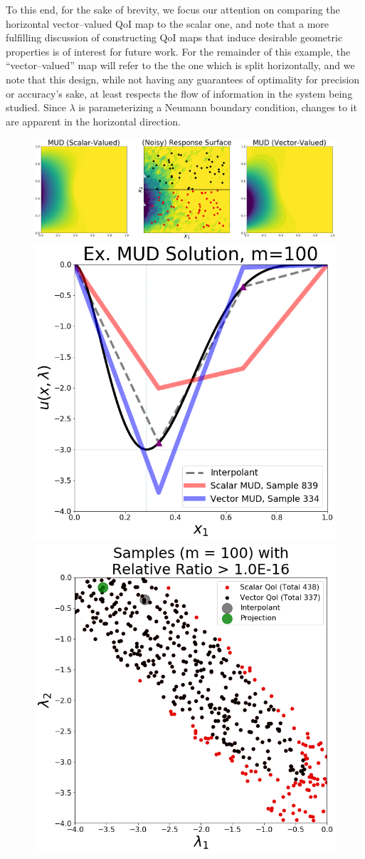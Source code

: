To this end, for the sake of brevity, we focus our attention on comparing the horizontal vector--valued QoI map to the scalar one, and note that a more fulfilling discussion of constructing QoI maps that induce desirable geometric properties is of interest for future work.
For the remainder of this example, the ``vector--valued'' map will refer to the the one which is split horizontally, and we note that this design, while not having any guarantees of optimality for precision or accuracy's sake, at least respects the flow of information in the system being studied.
Since $\lambda$ is parameterizing a Neumann boundary condition, changes to it are apparent in the horizontal direction.

\begin{figure}[htbp]
\centering
  \includegraphics[width=0.95\linewidth]{figures/pde-highd/pde-highd_surf_exmud_D2_m100}
  \includegraphics[width=0.6\linewidth]{figures/pde-highd/pde-highd_comp_exmud_D2_m100}
  \includegraphics[width=0.45\linewidth]{figures/pde-highd/pde-highd_update_scatter_D2_t1-0E-16}

\end{figure}
